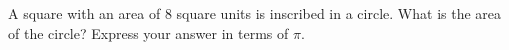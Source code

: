 A square with an area of $8$ square units is inscribed in a circle. What is the area of the circle? Express your answer in terms of $\pi$.
